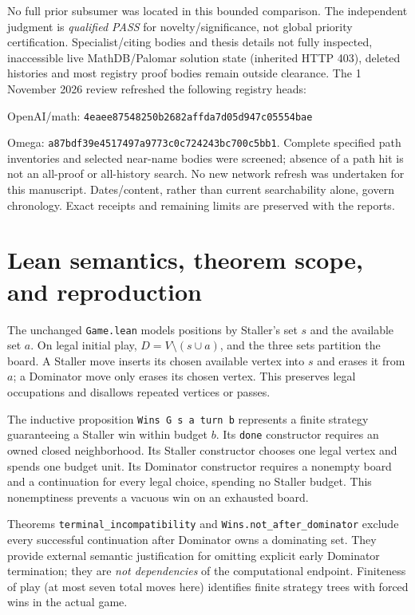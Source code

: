 \documentclass[11pt]{article}
\begin{document}
No full prior subsumer was located in this bounded comparison. The independent judgment is \emph{qualified PASS} for novelty/significance, not global priority certification. Specialist/citing bodies and thesis details not fully inspected, inaccessible live MathDB/Palomar solution state (inherited HTTP 403), deleted histories and most registry proof bodies remain outside clearance. The 1 November 2026 review refreshed the following registry heads:\par OpenAI/math:
\texttt{4eaee87548250b2682af}\allowbreak\texttt{fda7d05d947c05554bae}
\par Omega:
\texttt{a87bdf39e4517497a977}\allowbreak\texttt{3c0c724243bc700c5bb1}.
Complete specified path inventories and selected near-name bodies were screened; absence of a path hit is not an all-proof or all-history search. No new network refresh was undertaken for this manuscript. Dates/content, rather than current searchability alone, govern chronology. Exact receipts and remaining limits are preserved with the reports.

\section{Lean semantics, theorem scope, and reproduction}
The unchanged \texttt{Game.lean} models positions by Staller's set $s$ and the available set $a$. On legal initial play, $D=V\setminus(s\cup a)$, and the three sets partition the board. A Staller move inserts its chosen available vertex into $s$ and erases it from $a$; a Dominator move only erases its chosen vertex. This preserves legal occupations and disallows repeated vertices or passes.

The inductive proposition \texttt{Wins G s a turn b} represents a finite strategy guaranteeing a Staller win within budget $b$. Its \texttt{done} constructor requires an owned closed neighborhood. Its Staller constructor chooses one legal vertex and spends one budget unit. Its Dominator constructor requires a nonempty board and a continuation for every legal choice, spending no Staller budget. This nonemptiness prevents a vacuous win on an exhausted board.

Theorems \texttt{terminal\_incompatibility} and \texttt{Wins.not\_after\_dominator} exclude every successful continuation after Dominator owns a dominating set. They provide external semantic justification for omitting explicit early Dominator termination; they are \emph{not dependencies} of the computational endpoint. Finiteness of play (at most seven total moves here) identifies finite strategy trees with forced wins in the actual game.
\end{document}
